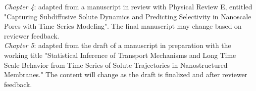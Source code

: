   \noindent\textit{Chapter 4}: adapted from a manuscript in review with Physical Review E, entitled 
  "Capturing Subdiffusive Solute Dynamics and Predicting Selectivity in Nanoscale Pores
  with Time Series Modeling". The final manuscript may change based on reviewer feedback. \\
    
  \noindent\textit{Chapter 5}: adapted from the draft of a manuscript in preparation with the working
  title "Statistical Inference of Transport Mechanisms and Long Time Scale Behavior from Time Series 
  of Solute Trajectories in Nanostructured Membranes." The content will change as the
  draft is finalized and after reviewer feedback.
